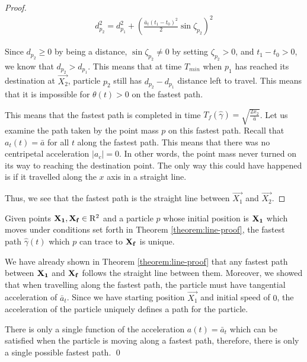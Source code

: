 \begin{proof}
\begin{eqnarray}
d_{p_2}^2 = d_{p_1}^2 + \left(\frac{\bar{a}_t (t_1 - t_0)^2}{2} \sin \zeta_{p_2} \right)^2
\end{eqnarray}

Since $d_{p_2} \geq 0$ by being a distance, $\sin \zeta_{p_2} \neq 0$ by setting $\zeta_{p_2} > 0$, and $t_1 - t_0 > 0$, we know that $d_{p_2} > d_{p_1}$. This means that at time $T_{min}$ when $p_1$ has reached its destination at $\Vec{X_2}$, particle $p_2$ still has $d_{p_2} - d_{p_1}$ distance left to travel. This means that it is impossible for $\theta(t) > 0$ on the fastest path.

This means that the fastest path is completed in time $T_f(\hat{\gamma}) = \sqrt{\frac{2 x_2}{\bar{a}}}$. Let us examine the path taken by the point mass $p$ on this fastest path. Recall that $a_t(t) = \bar{a}$ for all $t$ along the fastest path. This means that there was no centripetal acceleration $|a_c| = 0$. In other words, the point mass never turned on its way to reaching the destination point. The only way this could have happened is if it travelled along the $x$ axis in a straight line.

Thus, we see that the fastest path is the straight line between $\vec{X_1}$ and $\vec{X_2}$.
\end{proof}

\begin{corollary}
  Given points $\mathbf{X_1}, \mathbf{X_f} \in \mathrm{R}^2$ and a particle $p$ whose initial position is $\mathbf{X_1}$ which moves under conditions set forth in Theorem \ref{theorem:line-proof}, the fastest path $\hat{\gamma}(t)$ which $p$ can trace to $\mathbf{X_f}$ is unique.
\end{corollary}
\proof We have already shown in Theorem \ref{theorem:line-proof} that any fastest path between $\mathbf{X_1}$ and $\mathbf{X_f}$ follows the straight line between them. Moreover, we showed that when travelling along the fastest path, the particle must have tangential acceleration of $\bar{a}_t$. Since we have starting position $\vec{X_1}$ and initial speed of $0$, the acceleration of the particle uniquely defines a path for the particle.

There is only a single function of the acceleration $a(t) = \bar{a}_t$ which can be satisfied when the particle is moving along a fastest path, therefore, there is only a single possible fastest path.
\qed



